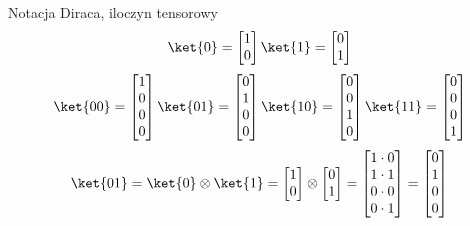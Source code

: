 \begin{frame}{Notacja Diraca, iloczyn tensorowy}
  $$\ket{0}=\begin{bmatrix}1\\0
        \end{bmatrix}
        \ket{1}=\begin{bmatrix}0\\1
        \end{bmatrix}$$ 
       $$\ket{00}=\begin{bmatrix}1\\0\\0\\0
       \end{bmatrix}
        \ket{01}=\begin{bmatrix}0\\1\\0\\0
        \end{bmatrix}
        \ket{10}=\begin{bmatrix}0\\0\\1\\0
        \end{bmatrix}
       \ket{11}=\begin{bmatrix}0\\0\\0\\1
       \end{bmatrix}$$ 
        $$\ket{01}=\ket{0}\otimes\ket{1}=
        \begin{bmatrix}1\\0
        \end{bmatrix}\otimes
\begin{bmatrix}0\\1
        \end{bmatrix}=
       \begin{bmatrix}1\cdot0\\1\cdot1\\0\cdot0\\0\cdot1
        \end{bmatrix}=\begin{bmatrix}0\\1\\0\\0
        \end{bmatrix}$$
        
\end{frame}
